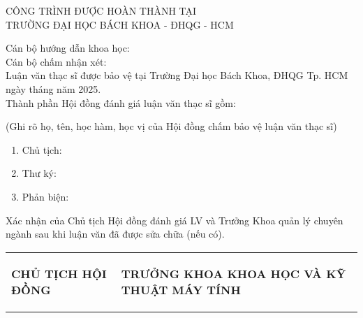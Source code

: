 \begin{boxA}
\begin{titlepage}
\begin{center}
    CÔNG TRÌNH ĐƯỢC HOÀN THÀNH TẠI\\
    TRƯỜNG ĐẠI HỌC BÁCH KHOA - ĐHQG - HCM
\end{center}

Cán bộ hướng dẫn khoa học:
\\

Cán bộ chấm nhận xét: 
\\

Luận văn thạc sĩ được bảo vệ tại Trường Đại học Bách Khoa, ĐHQG Tp. HCM ngày    tháng    năm 2025.
\\

Thành phần Hội đồng đánh giá luận văn thạc sĩ gồm:

(Ghi rõ họ, tên, học hàm, học vị của Hội đồng chấm bảo vệ luận văn thạc sĩ)
\begin{enumerate}
    \item Chủ tịch: 
    \item Thư ký: 
    \item Phản biện: 
\end{enumerate}

Xác nhận của Chủ tịch Hội đồng đánh giá LV và Trưởng Khoa quản lý chuyên ngành sau khi luận văn đã được sửa chữa (nếu có).

\vspace{1em}
\begin{tabular}
{p{} p{}}
     \begin{center}
         \textbf{CHỦ TỊCH HỘI ĐỒNG}
     \end{center}& \begin{center}
         \textbf{TRƯỞNG KHOA KHOA HỌC VÀ KỸ THUẬT MÁY TÍNH}
     \end{center}   \\
\end{tabular}
\end{titlepage}
\end{boxA}